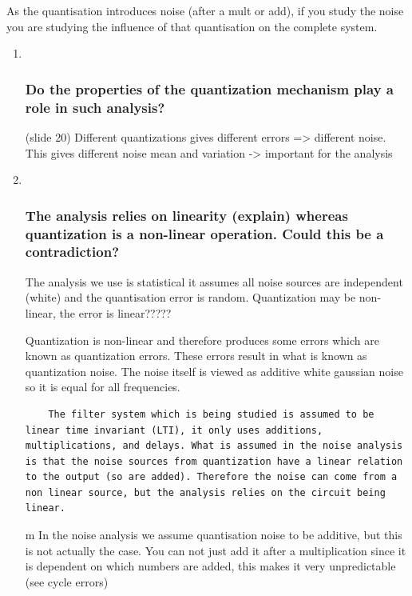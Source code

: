 \documentclass[
  a4paper,
  ,captions=tableheading
]{scrartcl}
\begin{document}
As the quantisation introduces noise (after a mult or add), if you study
the noise you are studying the influence of that quantisation on the
complete system.

\begin{enumerate}
\def\labelenumi{\arabic{enumi}.}
\setcounter{enumi}{1}
\item ~
  \subsubsection{Do the properties of the quantization mechanism play a
  role in such
  analysis?}\label{do-the-properties-of-the-quantization-mechanism-play-a-role-in-such-analysis}

  (slide 20) Different quantizations gives different errors
  =\textgreater{} different noise. This gives different noise mean and
  variation -\textgreater{} important for the analysis
\item ~
  \subsubsection{The analysis relies on linearity (explain) whereas
  quantization is a non-linear operation. Could this be a
  contradiction?}\label{the-analysis-relies-on-linearity-explain-whereas-quantization-is-a-non-linear-operation.-could-this-be-a-contradiction}

  The analysis we use is statistical it assumes all noise sources are
  independent (white) and the quantisation error is random. Quantization
  may be non- linear, the error is linear?????

  Quantization is non-linear and therefore produces some errors which
  are known as quantization errors. These errors result in what is known
  as quantization noise. The noise itself is viewed as additive white
  gaussian noise so it is equal for all frequencies.

\begin{lstlisting}
    The filter system which is being studied is assumed to be linear time invariant (LTI), it only uses additions, multiplications, and delays. What is assumed in the noise analysis is that the noise sources from quantization have a linear relation to the output (so are added). Therefore the noise can come from a non linear source, but the analysis relies on the circuit being linear.   
\end{lstlisting}

  m In the noise analysis we assume quantisation noise to be additive,
  but this is not actually the case. You can not just add it after a
  multiplication since it is dependent on which numbers are added, this
  makes it very unpredictable (see cycle errors)
\end{enumerate}
\end{document}
